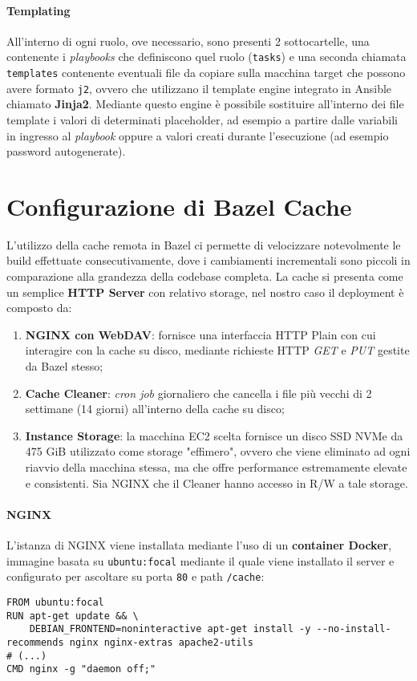 \documentclass[../main.tex]{subfiles}
\begin{document}
                \paragraph{Templating}
                All'interno di ogni ruolo, ove necessario, sono presenti 2 sottocartelle, una contenente i \emph{playbooks} che definiscono quel ruolo (\verb|tasks|) e una seconda chiamata \verb|templates| contenente eventuali file da copiare sulla macchina target che possono avere formato \verb|j2|, ovvero che utilizzano il template engine integrato in Ansible chiamato \textbf{Jinja2}. Mediante questo engine è possibile sostituire all'interno dei file template i valori di determinati placeholder, ad esempio a partire dalle variabili in ingresso al \emph{playbook} oppure a valori creati durante l'esecuzione (ad esempio password autogenerate).
    	
    	\section{Configurazione di Bazel Cache}
    	
    	    L'utilizzo della cache remota in Bazel ci permette di velocizzare notevolmente le build effettuate consecutivamente, dove i cambiamenti incrementali sono piccoli in comparazione alla grandezza della codebase completa. La cache si presenta come un semplice \textbf{HTTP Server} con relativo storage, nel nostro caso il deployment è composto da:
    	    \begin{enumerate}
    	        \item \textbf{NGINX con WebDAV}: fornisce una interfaccia HTTP Plain con cui interagire con la cache su disco, mediante richieste HTTP \emph{GET} e \emph{PUT} gestite da Bazel stesso;
    	        \item \textbf{Cache Cleaner}: \emph{cron job} giornaliero che cancella i file più vecchi di 2 settimane (14 giorni) all'interno della cache su disco;
    	        \item \textbf{Instance Storage}: la macchina EC2 scelta fornisce un disco SSD NVMe da 475 GiB utilizzato come storage "effimero", ovvero che viene eliminato ad ogni riavvio della macchina stessa, ma che offre performance estremamente elevate e consistenti. Sia NGINX che il Cleaner hanno accesso in R/W a tale storage.
    	    \end{enumerate}
    	    
    	    \paragraph{NGINX}
    	    L'istanza di NGINX viene installata mediante l'uso di un \textbf{container Docker}, immagine basata su \verb|ubuntu:focal| mediante il quale viene installato il server e configurato per ascoltare su porta \verb|80| e path \verb|/cache|:
    	    \begin{lstlisting}[language=docker]
FROM ubuntu:focal
RUN apt-get update && \
    DEBIAN_FRONTEND=noninteractive apt-get install -y --no-install-recommends nginx nginx-extras apache2-utils
# (...)
CMD nginx -g "daemon off;"
    	    \end{lstlisting}
    	    
\end{document}
